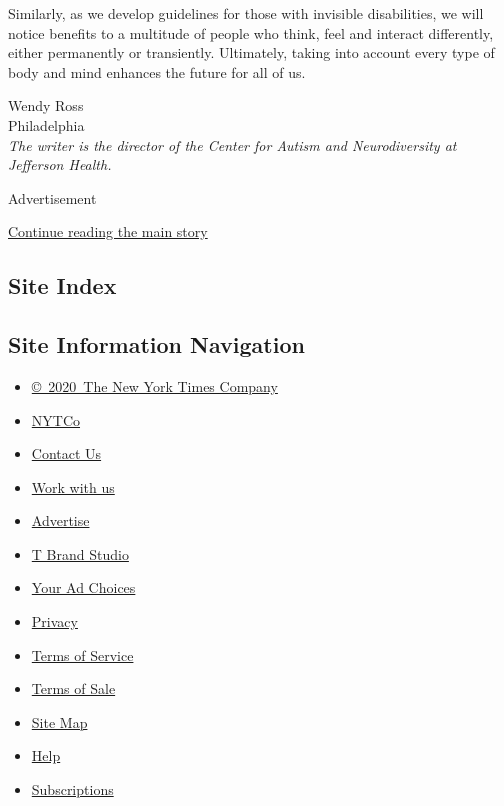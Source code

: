 Similarly, as we develop guidelines for those with invisible
disabilities, we will notice benefits to a multitude of people who
think, feel and interact differently, either permanently or transiently.
Ultimately, taking into account every type of body and mind enhances the
future for all of us.

Wendy Ross\\
Philadelphia\\
\emph{The writer is the director of the Center for Autism and
Neurodiversity at Jefferson Health.}

Advertisement

\protect\hyperlink{after-bottom}{Continue reading the main story}

\hypertarget{site-index}{%
\subsection{Site Index}\label{site-index}}

\hypertarget{site-information-navigation}{%
\subsection{Site Information
Navigation}\label{site-information-navigation}}

\begin{itemize}
\tightlist
\item
  \href{https://help.nytimes3xbfgragh.onion/hc/en-us/articles/115014792127-Copyright-notice}{©~2020~The
  New York Times Company}
\end{itemize}

\begin{itemize}
\tightlist
\item
  \href{https://www.nytco.com/}{NYTCo}
\item
  \href{https://help.nytimes3xbfgragh.onion/hc/en-us/articles/115015385887-Contact-Us}{Contact
  Us}
\item
  \href{https://www.nytco.com/careers/}{Work with us}
\item
  \href{https://nytmediakit.com/}{Advertise}
\item
  \href{http://www.tbrandstudio.com/}{T Brand Studio}
\item
  \href{https://www.nytimes3xbfgragh.onion/privacy/cookie-policy\#how-do-i-manage-trackers}{Your
  Ad Choices}
\item
  \href{https://www.nytimes3xbfgragh.onion/privacy}{Privacy}
\item
  \href{https://help.nytimes3xbfgragh.onion/hc/en-us/articles/115014893428-Terms-of-service}{Terms
  of Service}
\item
  \href{https://help.nytimes3xbfgragh.onion/hc/en-us/articles/115014893968-Terms-of-sale}{Terms
  of Sale}
\item
  \href{https://spiderbites.nytimes3xbfgragh.onion}{Site Map}
\item
  \href{https://help.nytimes3xbfgragh.onion/hc/en-us}{Help}
\item
  \href{https://www.nytimes3xbfgragh.onion/subscription?campaignId=37WXW}{Subscriptions}
\end{itemize}

